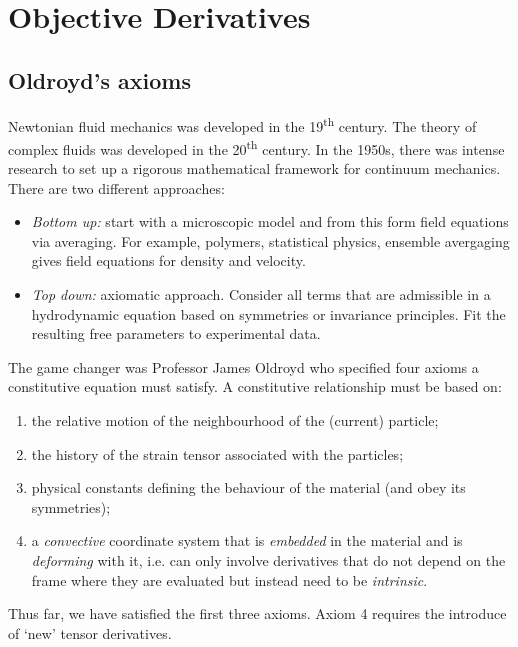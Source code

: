 \documentclass{jknotes}
\begin{document}
\section{Objective Derivatives}
\subsection{Oldroyd's axioms}
\label{topdown}
Newtonian fluid mechanics was developed in the 19\textsuperscript{th} century.
The theory of complex fluids was developed in the 20\textsuperscript{th}
century. In the 1950s, there was intense research to set up a rigorous
mathematical framework for continuum mechanics. There are two different
approaches:
\begin{itemize}
	\item \emph{Bottom up:} start with a microscopic model and from this form
		field equations via averaging. For example, polymers, statistical
		physics, ensemble avergaging gives field equations for density and
		velocity.
	\item \emph{Top down:} axiomatic approach. Consider all terms that are
		admissible in a hydrodynamic equation based on symmetries or
		invariance principles. Fit the resulting free parameters to
		experimental data.
\end{itemize}

The game changer was Professor James Oldroyd who specified four axioms a
constitutive equation must satisfy. A constitutive relationship must be based
on:
\begin{enumerate}
	\item the relative motion of the neighbourhood of the (current) particle;
	\item the history of the strain tensor associated with the particles;
	\item physical constants defining the behaviour of the material (and obey
		its symmetries);
	\item a \emph{convective} coordinate system that is \emph{embedded} in the
		material and is \emph{deforming} with it, i.e. can only involve
		derivatives that do not depend on the frame where they are evaluated
		but instead need to be \emph{intrinsic}.
\end{enumerate}

Thus far, we have satisfied the first three axioms. Axiom 4 requires the
introduce of `new' tensor derivatives.
\end{document}
